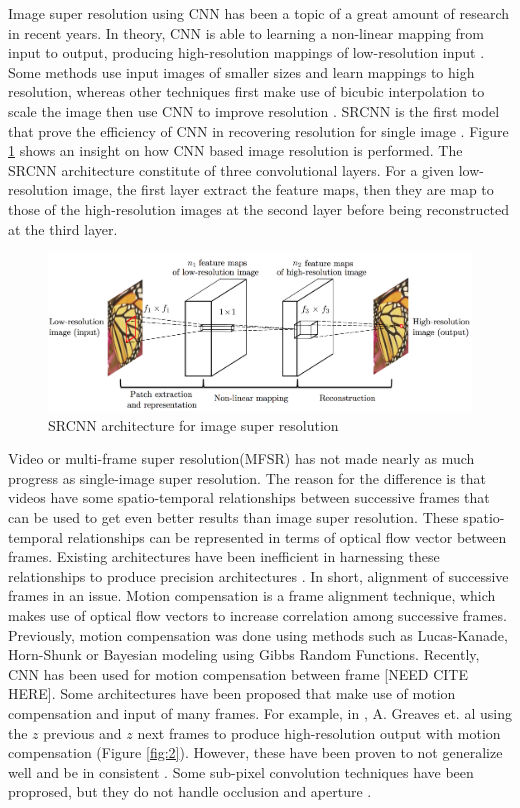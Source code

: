 \documentclass[10pt]{article}
\begin{document}
\noindent
Image super resolution using CNN has been a topic of a great amount of research in recent years. In theory, CNN is able to learning a non-linear mapping from input to output, producing high-resolution mappings of low-resolution input \cite{dong2016image}. Some methods use input images of smaller sizes and learn mappings to high resolution, whereas other techniques first make use of bicubic interpolation to scale the image then use CNN to improve resolution \cite{dong2016image}. SRCNN is the first model that prove the efficiency of CNN in recovering resolution for single image \cite{dong2016image}. Figure \ref{fig:1} shows an insight on how CNN based image resolution is performed. The SRCNN architecture constitute of three convolutional layers. For a given low-resolution image, the first layer extract the feature maps, then they are map to those of the high-resolution images at the second layer before being reconstructed at the third layer. 

\begin{figure}[H]
    \centering
    \includegraphics[scale=0.35]{figs/cnn.png}
    \caption{SRCNN architecture for image super resolution}
    \label{fig:1}
\end{figure}

\noindent
Video or multi-frame super resolution(MFSR) has not made nearly as much progress as single-image super resolution. The reason for the difference is that videos have some spatio-temporal relationships between successive frames that can be used to get even better results than image super resolution. These spatio-temporal relationships can be represented in terms of optical flow vector between frames. Existing architectures have been inefficient in harnessing these relationships to produce precision architectures \cite{caballero2016real}. In short, alignment of successive frames in an issue. Motion compensation is a frame alignment technique, which makes use of optical flow vectors to increase correlation among successive frames. Previously, motion compensation was done using methods such as Lucas-Kanade, Horn-Shunk or Bayesian modeling using Gibbs Random Functions. Recently, CNN has been used for motion compensation between frame [NEED CITE HERE]. Some architectures have been proposed that make use of motion compensation and input of many frames. For example, in \cite{greavesmulti}, A. Greaves et. al using the $z$ previous and $z$ next frames to produce high-resolution output with motion compensation (Figure \ref{fig:2}). However, these have been proven to not generalize well and be in consistent \cite{tao2017detail}. Some sub-pixel convolution techniques have been proprosed, but they do not handle occlusion and aperture \cite{shi2016real}.
\end{document}
